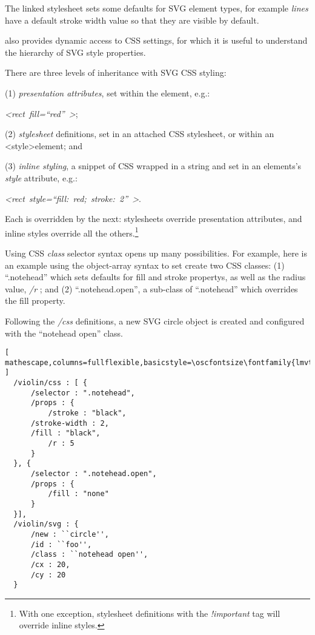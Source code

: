 The linked stylesheet sets some defaults for SVG element types, for example \textit{lines} have a default stroke width value so that they are visible by default.

\drawsocket also provides dynamic access to CSS settings, for which it is useful to understand the hierarchy of SVG style properties. 

There are three levels of inheritance with SVG CSS styling: 

(1) \textit{presentation attributes}, set within the element, e.g.:

\textit{\textless rect~fill=``red''~\textgreater}; 

(2) \textit{stylesheet} definitions, set in an attached CSS stylesheet, or within an \textless style\textgreater element;
and

(3) \textit{inline styling}, a snippet of CSS wrapped in a string and set in an elements's \textit{style} attribute, e.g.:

\textit{\textless rect~style=``fill:~red;~stroke:~2''~\textgreater}.

Each is overridden by the next: stylesheets override presentation attributes, and inline styles override all the others.\footnote{With one exception, stylesheet definitions with the \textit{!important} tag will override inline styles.} 

Using CSS \textit{class} selector syntax opens up many possibilities.
For example, here is an example using the object-array syntax to set create two CSS classes: (1) ``.notehead'' which sets defaults for fill and stroke propertys, as well as the radius value, \textit{/r} ; and (2) ``.notehead.open'', a sub-class of ``.notehead'' which overrides the fill property. 

Following the \textit{/css} definitions, a new SVG circle object is created and configured with the ``notehead open'' class.

\begin{lstlisting}[ mathescape,columns=fullflexible,basicstyle=\oscfontsize\fontfamily{lmvtt}\selectfont ]
  /violin/css : [ {
      /selector : ".notehead",
      /props : {
          /stroke : "black",
	  /stroke-width : 2,
	  /fill : "black",
          /r : 5
      }
  }, {
      /selector : ".notehead.open",
      /props : {
          /fill : "none"
      }
  }],
  /violin/svg : {
      /new : ``circle'',
      /id : ``foo'',
      /class : ``notehead open'',
      /cx : 20,
      /cy : 20
  }
 \end{lstlisting}


